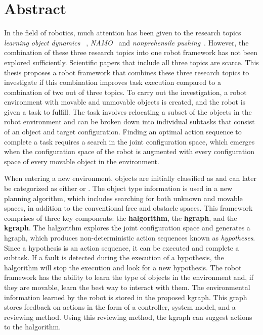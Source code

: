 \chapter*{Abstract}
In the field of robotics, much attention has been given to the research topics \textit{learning object dynamics}~\cite{cong_selfadapting_2020,seegmiller_vehicle_2013}
, \textit{\acf{NAMO}}~\cite{chen_fast_2018,elbanhawi_samplingbased_2014,kingston_samplingbased_2018,lavalle_planning_2006} and \textit{nonprehensile pushing}~\cite{arruda_uncertainty_2017,bauza_dataefficient_2018,mericli_pushmanipulation_2015,stuber_featurebased_2018,stuber_let_2020,toussaint_sequenceofconstraints_2022}. However, the combination of these three research topics into one robot framework has not been explored sufficiently. Scientific papers that include all three topics are scarce. This thesis proposes a robot framework that combines these three research topics to investigate if this combination improves task execution compared to a combination of two out of three topics. To carry out the investigation, a robot environment with movable and unmovable objects is created, and the robot is given a task to fulfill. The task involves relocating a subset of the objects in the robot environment and can be broken down into individual subtasks that consist of an object and target configuration. Finding an optimal action sequence to complete a task requires a search in the joint configuration space, which emerges when the configuration space of the robot is augmented with every configuration space of every movable object in the environment.\bs

When entering a new environment, objects are initially classified as  and can later be categorized as either  or . The object type information is used in a new planning algorithm, which includes searching for both unknown and movable spaces, in addition to the conventional free and obstacle spaces. This framework comprises of three key components: the \textbf{\acl{halgorithm}}, the \textbf{\acl{hgraph}}, and the \textbf{\acl{kgraph}}. The \acl{halgorithm} explores the joint configuration space and generates a \acl{hgraph}, which produces non-deterministic action sequences known as \textit{hypotheses}. Since a hypothesis is an action sequence, it can be executed and complete a subtask. If a fault is detected during the execution of a hypothesis, the \acl{halgorithm} will stop the execution and look for a new hypothesis. The robot framework has the ability to learn the type of objects in the environment and, if they are movable, learn the best way to interact with them. The environmental information learned by the robot is stored in the proposed \acl{kgraph}. This graph stores feedback on actions in the form of a controller, system model, and a reviewing method. Using this reviewing method, the \acl{kgraph} can suggest actions to the \acl{halgorithm}.\bs

